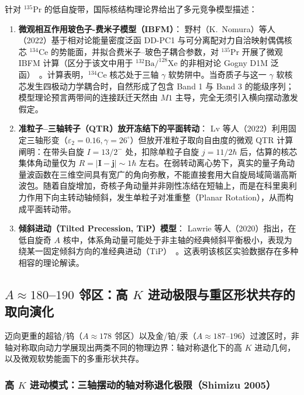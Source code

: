 针对 $^{135}\mathrm{Pr}$ 的低自旋带，国际核结构理论界给出了多元竞争模型描述：
\begin{enumerate}
\item \textbf{微观相互作用玻色子-费米子模型（IBFM）}：
野村（K.~Nomura）等人（2022）基于相对论能量密度泛函 DD-PC1 与可分离配对力自洽映射偶偶核芯 $^{134}\mathrm{Ce}$ 的势能面，并拟合费米子--玻色子耦合参数，对 $^{135}\mathrm{Pr}$ 开展了微观 IBFM 计算（区分于该文中用于 $^{132}\mathrm{Ba} / ^{128}\mathrm{Xe}$ 的非相对论 Gogny D1M 泛函）~\cite{nomura-2022-questioning-wobbling-ibfm}。计算表明，$^{134}\mathrm{Ce}$ 核芯处于三轴 $\gamma$ 软势阱中。当奇质子与这一 $\gamma$ 软核芯发生四极动力学耦合时，自然形成了包含 Band 1 与 Band 3 的能级序列；模型理论预言两带间的连接跃迁天然由 $M1$ 主导，完全无须引入横向摆动激发假定。
\item \textbf{准粒子--三轴转子（QTR）放开冻结下的平面转动}：
Lv 等人（2022）利用固定三轴形变（$\varepsilon_2 = 0.16, \gamma = 26^\circ$）但放开准粒子取向自由度的微观 QTR 计算阐明：在带头自旋 $I = 13/2^-$ 处，扣除单粒子自旋 $j = 11/2\hbar$ 后，估算的核芯集体角动量仅为 $R = |\mathbf{I} - \mathbf{j}| \sim 1\hbar$ 左右。在弱转动离心势下，真实的量子角动量波函数在三维空间具有宽广的角向弥散，不能直接套用大自旋局域简谐高斯波包。随着自旋增加，奇核子角动量并非刚性冻结在短轴上，而是在科里奥利力作用下向主转动轴倾斜，发生单粒子对准重整（Planar Rotation），从而构成平面转动带。
\item \textbf{倾斜进动（Tilted Precession, TiP）模型}：
Lawrie 等人（2020）指出，在低自旋奇 $A$ 核中，体系角动量可能处于非主轴的经典倾斜平衡极小，表现为绕某一固定倾斜方向的准经典进动（TiP）~\cite{lawrie-2020-tilted-precession}。这表明该核区实验数据存在多种相容的理论解读。
\end{enumerate}

\subsection{$A\approx 180$--$190$ 邻区：高 $K$ 进动极限与重区形状共存的取向演化}\label{sec:4-4-4}

迈向更重的超铪/钨（$A\approx 178$ 邻区）以及金/铂/汞（$A\approx 187$--$196$）过渡区时，非轴对称取向动力学展现出两类不同的物理边界：轴对称退化下的高 $K$ 进动几何，以及微观软势能面下的多重形状共存。

\subsubsection{高 $K$ 进动模式：三轴摆动的轴对称退化极限（Shimizu 2005）}

